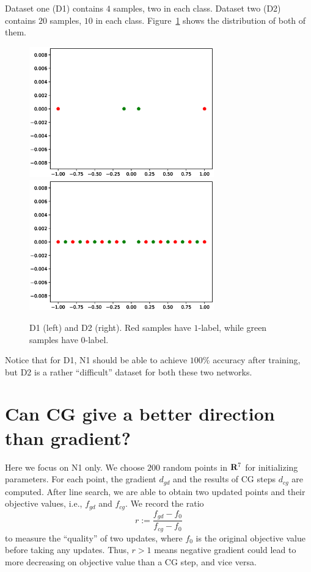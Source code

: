 \documentclass[12pt]{article}
\begin{document}
Dataset one (D1) contains $4$ samples, two in each class. Dataset two (D2) contains $20$ samples, $10$ in each class. Figure~\ref{fig:d}  shows the distribution of both of them.
\begin{figure}[h]
\includegraphics[width=8cm]{data1.eps}
\includegraphics[width=8cm]{data2.eps}
\caption{D1 (left) and D2 (right). Red samples have $1$-label, while green samples have $0$-label.}
\label{fig:d}
\end{figure}

Notice that for D1, N1 should be able to achieve $100\%$ accuracy after training, but D2 is a rather ``difficult'' dataset for both these two networks.

\section{Can CG give a better direction than gradient?}

Here we focus on N1 only. We choose $200$ random points in ${\bf R}^7$ for initializing parameters. For each point, the gradient $d_{gd}$ and the results of CG steps $d_{cg}$ are computed. After line search, we are able to obtain two updated points and their objective values, i.e., $f_{gd}$ and $f_{cg}$. We record the ratio
$$ r:=\frac{f_{gd} - f_0}{f_{cg} - f_0 } $$
to measure the ``quality'' of two updates, where $f_0$ is the original objective value before taking any updates. Thus, $r>1$ means negative gradient could lead to more decreasing on objective value than a CG step, and vice versa.
\end{document}
